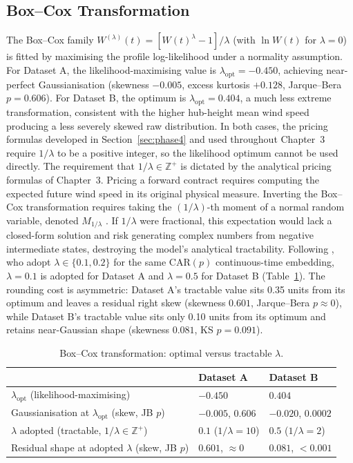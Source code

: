 \subsection{Box--Cox Transformation}
\label{sec:phase1-boxcox}

The Box--Cox family $W^{(\lambda)}(t) = [W(t)^\lambda - 1]/\lambda$ (with $\ln W(t)$ for $\lambda = 0$) is fitted by maximising the profile log-likelihood under a normality assumption. For Dataset A, the likelihood-maximising value is $\lambda_{\text{opt}} = -0.450$, achieving near-perfect Gaussianisation (skewness $-0.005$, excess kurtosis $+0.128$, Jarque--Bera $p = 0.606$). For Dataset B, the optimum is $\lambda_{\text{opt}} = 0.404$, a much less extreme transformation, consistent with the higher hub-height mean wind speed producing a less severely skewed raw distribution. In both cases, the pricing formulas developed in Section~\ref{sec:phase4} and used throughout Chapter~3 require $1/\lambda$ to be a positive integer, so the likelihood optimum cannot be used directly. The requirement that $1/\lambda \in \mathbb{Z}^+$ is dictated by the analytical pricing formulas of Chapter~3. Pricing a forward contract requires computing the expected future wind speed in its original physical measure. Inverting the Box--Cox transformation requires taking the $(1/\lambda)$-th moment of a normal random variable, denoted $M_{1/\lambda}$ \citep{BenthSaltyteBenth2009}. If $1/\lambda$ were fractional, this expectation would lack a closed-form solution and risk generating complex numbers from negative intermediate states, destroying the model's analytical tractability. Following \citet{BenthSaltyteBenth2009}, who adopt $\lambda \in \{0.1, 0.2\}$ for the same CAR$(p)$ continuous-time embedding, $\lambda = 0.1$ is adopted for Dataset A and $\lambda = 0.5$ for Dataset B (Table~\ref{tab:boxcox}). The rounding cost is asymmetric: Dataset A's tractable value sits 0.35 units from its optimum and leaves a residual right skew (skewness $0.601$, Jarque--Bera $p \approx 0$), while Dataset B's tractable value sits only 0.10 units from its optimum and retains near-Gaussian shape (skewness $0.081$, KS $p = 0.091$).

\begin{table}[htbp]
\centering
\caption{Box--Cox transformation: optimal versus tractable $\lambda$.}
\label{tab:boxcox}
\begin{tabular}{l l l}
\toprule
& \textbf{Dataset A} & \textbf{Dataset B} \\
\midrule
$\lambda_{\text{opt}}$ (likelihood-maximising) & $-0.450$ & $0.404$ \\
Gaussianisation at $\lambda_{\text{opt}}$ (skew, JB $p$) & $-0.005$, $0.606$ & $-0.020$, $0.0002$ \\
$\lambda$ adopted (tractable, $1/\lambda \in \mathbb{Z}^+$) & $\mathbf{0.1}$ ($1/\lambda = 10$) & $\mathbf{0.5}$ ($1/\lambda = 2$) \\
Residual shape at adopted $\lambda$ (skew, JB $p$) & $0.601$, $\approx 0$ & $0.081$, $< 0.001$ \\
\bottomrule
\end{tabular}
\end{table}

